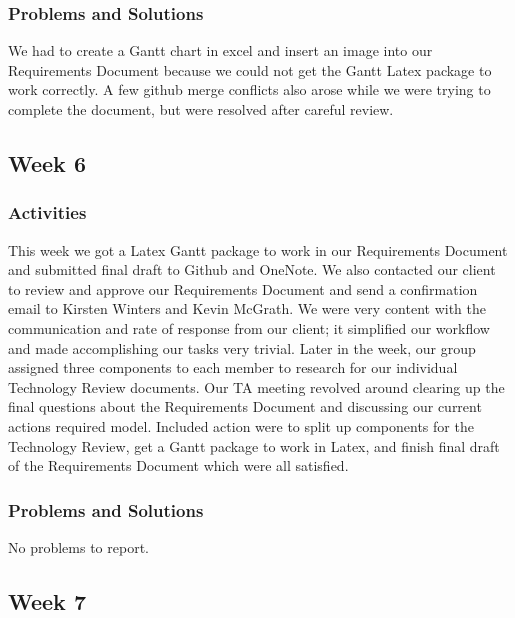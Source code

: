 \documentclass[journal,10pt,onecolumn,compsoc]{IEEEtran} \usepackage[margin=1.0in]{geometry} \usepackage{pdfpages}
\begin{document}
    \subsubsection{Problems and Solutions} 
    We had to create a Gantt chart in excel and insert an image into our Requirements Document because we could not get the Gantt Latex package to work correctly.
	A few github merge conflicts also arose while we were trying to complete the document, but were resolved after careful review.
    \subsection{Week 6}
    \subsubsection{Activities} 
    This week we got a Latex Gantt package to work in our Requirements Document and submitted final draft to Github and OneNote. We also contacted our client to review and approve our Requirements Document and send a confirmation email to Kirsten Winters and Kevin McGrath. We were very content with the communication and rate of response from our client; it simplified our workflow and made accomplishing our tasks very trivial. Later in the week, our group assigned three components to each member to research for our individual Technology Review documents.
    \noindent Our TA meeting revolved around clearing up the final questions about the Requirements Document and discussing our current actions required model. Included action were to split up components for the Technology Review, get a Gantt package to work in Latex, and finish final draft of the Requirements Document which were all satisfied.
    
    \subsubsection{Problems and Solutions} 
	No problems to report.
    \subsection{Week 7}
\end{document}
